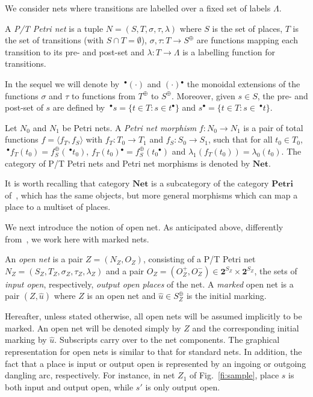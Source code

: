 \documentclass{LMCS}
\newcommand{\init}[1]{\hat{#1}}
\newcommand{\mon}[1]{\ensuremath{{#1}^\oplus}}
\newcommand{\monSub}[2]{\ensuremath{{#1}_{#2}^\oplus}}
\newcommand{\src}{\ensuremath{\sigma}}
\newcommand{\trg}{\ensuremath{\tau}}
\newcommand{\pre}[1][(\cdot)]{\ensuremath{\!~^\bullet{#1}}}
\newcommand{\post}[1][(\cdot)]{\ensuremath{{#1} {^\bullet}}}
\newcommand{\net}{\ensuremath{\mathbf{Net}}}
\begin{document}
We consider nets where transitions are labelled over a fixed set of
labels $\Lambda$.

\begin{defi}
  A \emph{P/T Petri net} is a tuple $N = (S, T, \src, \trg, \lambda)$
  where $S$ is the set of places, $T$ is the set of transitions (with
  $S \cap T = \emptyset$), $\src, \trg : T \to \mon{S}$ are functions
  mapping each transition to its pre- and post-set and $\lambda : T
  \to \Lambda$ is a labelling function for transitions.
\end{defi}
In the sequel we will denote by $\pre$ and $\post$ the monoidal
extensions of the functions $\src$ and $\trg$ to functions from
$\mon{T}$ to $\mon{S}$.
Moreover, given $s \in S$, the pre- and post-set of $s$ are
defined by $\pre[s] = \{ t \in T : s \in \post[t] \}$ and $\post[s]
= \{ t \in T : s \in \pre[t] \}$.

\begin{defi}
  Let $N_0$ and $N_1$ be Petri nets. A \emph{Petri net morphism} $f :
  N_0 \to N_1$ is a pair of total functions $f = \langle f_T, f_S
  \rangle$ with $f_T : T_0 \to T_1$ and $f_S : S_0 \to S_1$, such that
  for all $t_0 \in T_0$, $\pre[f_T(t_0)] = \monSub{f}{S}(\pre[t_0])$,
  $\post[f_T(t_0)] = \monSub{f}{S}(\post[t_0])$ and $\lambda_1(f_T(t_0)) =
  \lambda_0(t_0)$.
The category of P/T Petri nets and Petri net morphisms is denoted by
  $\net$.
\end{defi}
It is worth recalling that category $\net$ is a subcategory of the category
$\mathbf{Petri}$ of~\cite{MM:PNM}, which has the same objects, but
more general morphisms which can map a place to a multiset of
places.

We next introduce the notion of open net. As anticipated above,
differently from~\cite{BCEH:CMRS,BCEH:CSOP}, we work here with marked nets.


\begin{defi}
  \label{de:open-net}
  An \emph{open net} is a pair $Z = (N_Z, O_Z)$, consisting of a P/T Petri net 
$N_Z = (S_Z, T_Z, \src_Z, \trg_Z, \lambda_Z)$ and a pair
$O_Z = (O_Z^+, O_Z^-) \in \mathbf{2}^{S_Z} \times \mathbf{2}^{S_Z}$,
  the sets of \emph{input open}, respectively, \emph{output open places}
  of the net.
A \emph{marked} open net is a pair $(Z, \init{u})$ where $Z$ is an
  open net and $\init{u} \in \monSub{S}{Z}$ is the initial marking.
\end{defi}
Hereafter, unless stated otherwise, all open nets will be assumed
implicitly to be marked.  An open net will be denoted simply by $Z$ and
the corresponding initial marking by $\init{u}$. Subscripts carry over to the
net components.
The graphical representation for open nets is similar to that for
standard nets. In addition, the fact that a place is input or
output open is represented by an ingoing or outgoing dangling arc, 
respectively. 
For instance, in net $Z_1$ of Fig.~\ref{fi:sample}, place
$s$ is both input and output open, while $s'$ is only output open.
\end{document}
